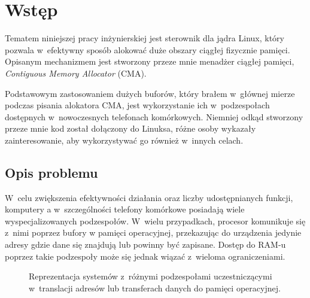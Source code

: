 \chapter{Wstęp}

Tematem niniejszej pracy inżynierskiej jest sterownik dla jądra Linux,
który pozwala w~efektywny sposób alokować duże obszary ciągłej
fizycznie pamięci.  Opisanym mechanizmem jest stworzony przeze mnie
menadżer ciągłej pamięci, \textit{Contiguous Memory Allocator} (CMA).

Podstawowym zastosowaniem dużych buforów, który brałem w~głównej
mierze podczas pisania alokatora CMA, jest wykorzystanie ich
w~podzespołach dostępnych w~nowoczesnych telefonach komórkowych.
Niemniej odkąd stworzony przeze mnie kod został dołączony do Linuksa,
różne osoby wykazały zainteresowanie, aby wykorzystywać go również
w~innych celach.


\section{Opis problemu}

W~celu zwiększenia efektywności działania oraz liczby udostępnianych
funkcji, komputery a w~szczególności telefony komórkowe posiadają
wiele wyspecjalizowanych podzespołów.  W~wielu przypadkach, procesor
komunikuje się z~nimi poprzez bufory w pamięci operacyjnej,
przekazując do urządzenia jedynie adresy gdzie dane się znajdują lub
powinny być zapisane.  Dostęp do RAM-u poprzez takie podzespoły może
się jednak wiązać z~wieloma ograniczeniami.

\begin{figure}[tbp]
  \centering
   \qquad
  \qquad
  \caption[Różne przestrzenie adresowe dostępne
    w~komputerze.]{Reprezentacja systemów z~różnymi podzespołami
    uczestniczącymi w~translacji adresów lub transferach danych do
    pamięci operacyjnej.}
  \label{fig:mmu-iommu}
\end{figure}

